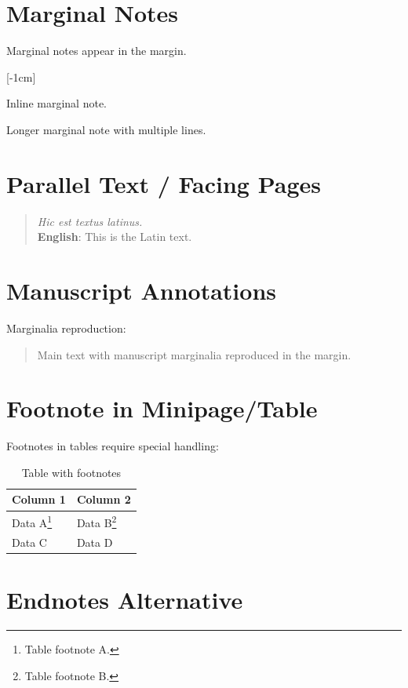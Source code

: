 \documentclass[12pt,a4paper]{article}
\begin{document}
\section{Marginal Notes}\label{sec:marginal}
Marginal notes appear in the margin.

[-1cm]%

Inline marginal note.

Longer marginal note with multiple lines.

\section{Parallel Text / Facing Pages}\label{sec:parallel}
\begin{quote}
\textit{Hic est textus latinus.}\\
\textbf{English}: This is the Latin text.
\end{quote}

\section{Manuscript Annotations}\label{sec:manuscript}
Marginalia reproduction:
\begin{quotation}
%
Main text with manuscript marginalia reproduced in the margin.
\end{quotation}

\section{Footnote in Minipage/Table}\label{sec:minipage}
Footnotes in tables require special handling:

\begin{table}[htbp]
\centering
\begin{minipage}{\linewidth}
\centering
\begin{tabular}{ll}
\hline
Column 1 & Column 2 \\
\hline
Data A\footnote{Table footnote A.} & Data B\footnote{Table footnote B.} \\
Data C & Data D \\
\hline
\end{tabular}
\caption{Table with footnotes}
\end{minipage}
\end{table}

\section{Endnotes Alternative}\label{sec:endnotes}
\end{document}
